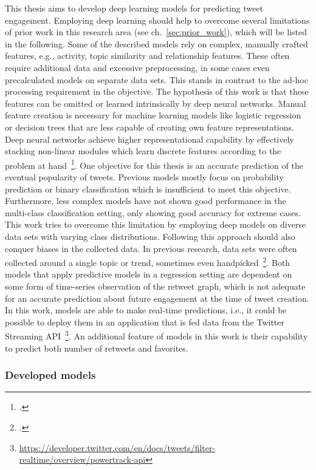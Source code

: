 This thesis aims to develop deep learning models for predicting tweet
engagement.
Employing deep learning should help to overcome several limitations of prior
work in this research area (see ch.~\ref{sec:prior_work}), which will be listed in the following.
Some of the described models rely on complex, manually crafted features, e.g.,
activity, topic similarity and relationship features.
These often require additional data and excessive preprocessing, in some cases
even precalculated models on separate data sets.
This stands in contrast to the ad-hoc processing requirement in the objective.
The hypothesis of this work is that these features can be omitted or
learned intrinsically by deep neural networks.
Manual feature creation is necessary for machine learning models like logistic
regression or decision trees that are less capable of creating own feature
representations.
Deep neural networks achieve higher representational capability by effectively
stacking non-linear modules which learn discrete features according to the problem at
hand~\footcite{LeCun2015}.
One objective for this thesis is an accurate prediction of the eventual popularity
of tweets.
Previous models mostly focus on probability prediction or binary classification
which is insufficient to meet this objective.
Furthermore, less complex models have not shown good performance in the multi-class
classification setting, only showing good accuracy for extreme cases.
This work tries to overcome this limitation by employing deep models on diverse
data sets with varying class distributions.
Following this approach should also conquer biases in the collected data.
In previous research, data sets were often collected around a single topic or
trend, sometimes even handpicked~\footcite{Zaman2014}.
Both models that apply predictive models in a regression setting are dependent
on some form of time-series observation of the retweet graph, which is not adequate for
an accurate prediction about future engagement at the time of tweet creation.
In this work, models are able to make real-time predictions, i.e., it could
be possible to deploy them in an application that is fed data from the Twitter
Streaming API~\footnote{\url{https://developer.twitter.com/en/docs/tweets/filter-realtime/overview/powertrack-api}}.
An additional feature of models in this work is their capability to predict both
number of retweets and favorites.

\subsubsection{Developed models}

